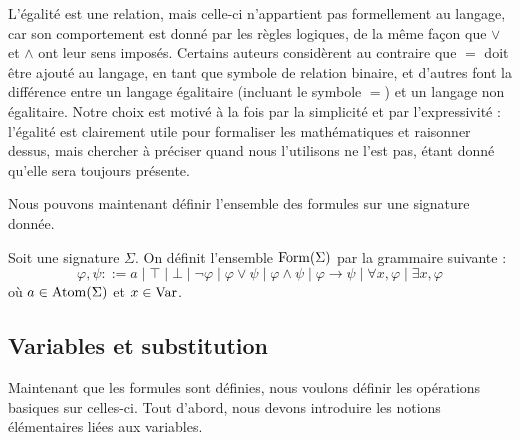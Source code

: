 \begin{remark}
  L'égalité est une relation, mais celle-ci n'appartient pas formellement au
  langage, car son comportement est donné par les règles logiques, de la même
  façon que $\lor$ et $\land$ ont leur sens imposés. Certains auteurs considèrent
  au contraire que $=$ doit être ajouté au langage, en tant que symbole de
  relation binaire, et d'autres font la différence entre un langage égalitaire
  (incluant le symbole $=$) et un langage non égalitaire. Notre choix est motivé
  à la fois par la simplicité et par l'expressivité : l'égalité est clairement
  utile pour formaliser les mathématiques et raisonner dessus, mais chercher à
  préciser quand nous l'utilisons ne l'est pas, étant donné qu'elle sera toujours
  présente.
\end{remark}

Nous pouvons maintenant définir l'ensemble des formules sur une signature donnée.

\begin{definition}[Formules]
  Soit une signature $\Sigma$. On définit l'ensemble $\operatorname{Form}(\Sigma)$ par
  la grammaire suivante :
  \[\varphi,\psi ::= a\mid \top\mid\bot\mid\lnot\varphi\mid\varphi\lor\psi\mid
  \varphi\land\psi\mid \varphi\to\psi\mid\forall x,\varphi\mid\exists x,\varphi\]
  où $a\in \operatorname{Atom}(\Sigma)$ et $x\in \operatorname{Var}$.
\end{definition}

\subsection{Variables et substitution}

Maintenant que les formules sont définies, nous voulons définir les opérations
basiques sur celles-ci. Tout d'abord, nous devons introduire les notions
élémentaires liées aux variables.

